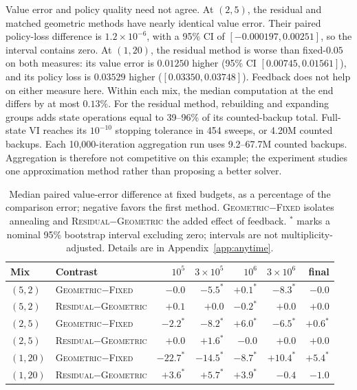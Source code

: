 \documentclass{article}
\newcommand{\R}{\textsc{Residual}}
\newcommand{\G}{\textsc{Geometric}}
\newcommand{\F}{\textsc{Fixed}}
\newcommand{\VI}{\textsc{VI}}
\begin{document}
Value error and policy quality need not agree.  At $(2,5)$, the residual and
matched geometric methods have nearly identical value error.  Their paired
policy-loss difference is $1.2\times10^{-6}$, with a 95\% CI of
$[-0.000197,0.00251]$, so the interval contains zero.  At $(1,20)$, the residual method is worse
than fixed-$0.05$ on both measures: its value error is $0.01250$ higher
(95\% CI $[0.00745,0.01561]$), and its policy loss is $0.03529$ higher
($[0.03350,0.03748]$).  Feedback does not help on either measure here.  Within each mix, the
median computation at the end differs by at most $0.13\%$.  For the residual
method, rebuilding and expanding groups adds state operations equal to
39--96\% of its counted-backup total.  Full-state \VI{} reaches its $10^{-10}$
stopping tolerance in 454 sweeps, or 4.20M counted backups.  Each
10,000-iteration aggregation run uses 9.2--67.7M counted backups.  Aggregation
is therefore not competitive on this example;
the experiment studies one approximation method rather than proposing a better
solver.

\begin{table}[t]
  \centering
  \small
  \caption{Median paired value-error difference at fixed budgets, as a
  percentage of the comparison error; negative favors the first method.
  \G{}$-$\F{} isolates annealing and \R{}$-$\G{} the added effect of
  feedback.  $^\ast$ marks a nominal 95\% bootstrap interval excluding zero;
  intervals are not multiplicity-adjusted.  Details are in
  Appendix~\ref{app:anytime}.}
  \label{tab:anytime}
  \scriptsize
  \begin{tabular}{@{}llrrrrr@{}}
    \toprule
    Mix & Contrast & $10^5$ & $3{\times}10^5$ & $10^6$ & $3{\times}10^6$ & final \\
    \midrule
    $(5,2)$  & \G{}$-$\F{} & $-0.0$  & $-5.5^\ast$   & $+0.1^\ast$   & $-8.3^\ast$   & $-0.0$ \\
    $(5,2)$  & \R{}$-$\G{} & $+0.1$  & $+0.0$        & $-0.2^\ast$   & $+0.0$        & $+0.0$ \\
    $(2,5)$  & \G{}$-$\F{} & $-2.2^\ast$  & $-8.2^\ast$  & $+6.0^\ast$  & $-6.5^\ast$   & $+0.6^\ast$ \\
    $(2,5)$  & \R{}$-$\G{} & $+0.0$  & $+1.6^\ast$   & $-0.0$        & $+0.0$        & $+0.0$ \\
    $(1,20)$ & \G{}$-$\F{} & $-22.7^\ast$ & $-14.5^\ast$ & $-8.7^\ast$ & $+10.4^\ast$ & $+5.4^\ast$ \\
    $(1,20)$ & \R{}$-$\G{} & $+3.6^\ast$  & $+5.7^\ast$ & $+3.9^\ast$ & $-0.4$      & $-1.0$ \\
    \bottomrule
  \end{tabular}
\end{table}
\end{document}
